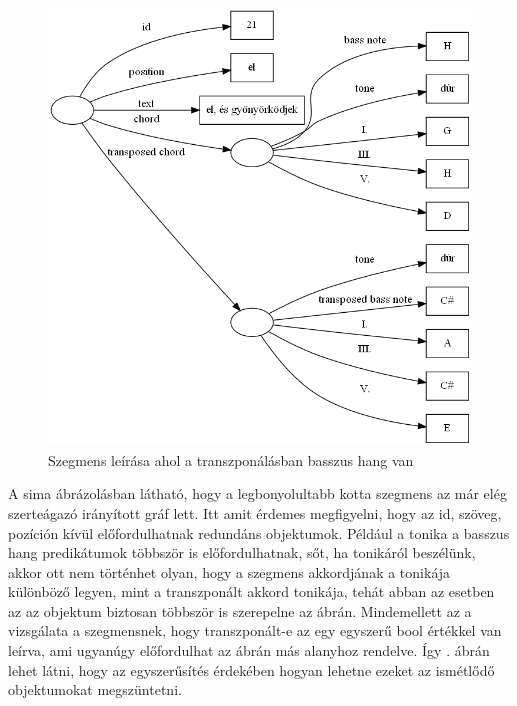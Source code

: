 \begin{figure}[h]
	\includegraphics[scale=0.5]{images/img_src/rdf_graph_6.png}
	\caption{Szegmens leírása ahol a transzponálásban basszus hang van}
	\label{fig:graph6}
\end{figure}

A sima ábrázolásban látható, hogy a legbonyolultabb kotta szegmens az már elég szerteágazó irányított gráf lett. Itt amit érdemes megfigyelni, hogy az id, szöveg, pozíción kívül előfordulhatnak redundáns objektumok. Például a tonika a basszus hang predikátumok többször is előfordulhatnak, sőt, ha tonikáról beszélünk, akkor ott nem történhet olyan, hogy a szegmens akkordjának a tonikája különböző legyen, mint a transzponált akkord tonikája, tehát abban az esetben az az objektum biztosan többször is szerepelne az ábrán. Mindemellett az a vizsgálata a szegmensnek, hogy transzponált-e az egy egyszerű bool értékkel van leírva, ami ugyanúgy előfordulhat az ábrán más alanyhoz rendelve. Így . ábrán lehet látni, hogy az egyszerűsítés érdekében hogyan lehetne ezeket az ismétlődő objektumokat megszüntetni.

